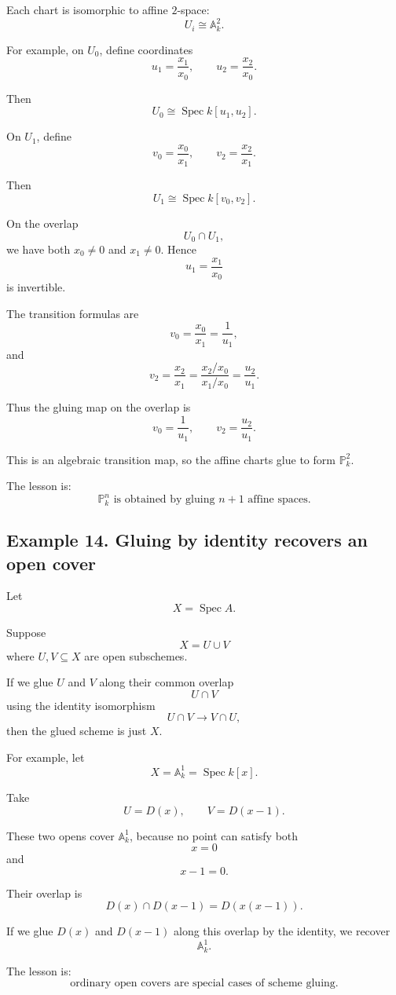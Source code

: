 \documentclass[12pt,a4paper]{article}
\newcommand{\Spec}{\operatorname{Spec}}
\theoremstyle{notespace}
\begin{document}
Each chart is isomorphic to affine \(2\)-space:
\[
U_i\cong\mathbb A^2_k.
\]

For example, on \(U_0\), define coordinates
\[
u_1=\frac{x_1}{x_0},
\qquad
u_2=\frac{x_2}{x_0}.
\]

Then
\[
U_0\cong\Spec k[u_1,u_2].
\]

On \(U_1\), define
\[
v_0=\frac{x_0}{x_1},
\qquad
v_2=\frac{x_2}{x_1}.
\]

Then
\[
U_1\cong\Spec k[v_0,v_2].
\]

On the overlap
\[
U_0\cap U_1,
\]
we have both \(x_0\neq0\) and \(x_1\neq0\). Hence
\[
u_1=\frac{x_1}{x_0}
\]
is invertible.

The transition formulas are
\[
v_0=\frac{x_0}{x_1}=\frac1{u_1},
\]
and
\[
v_2=\frac{x_2}{x_1}
=
\frac{x_2/x_0}{x_1/x_0}
=
\frac{u_2}{u_1}.
\]

Thus the gluing map on the overlap is
\[
v_0=\frac1{u_1},
\qquad
v_2=\frac{u_2}{u_1}.
\]

This is an algebraic transition map, so the affine charts glue to form \(\mathbb P^2_k\).

The lesson is:
\[
\boxed{
	\mathbb P^n_k
	\text{ is obtained by gluing }n+1\text{ affine spaces.}
}
\]

\subsection{Example 14. Gluing by identity recovers an open cover}

Let
\[
X=\Spec A.
\]

Suppose
\[
X=U\cup V
\]
where \(U,V\subseteq X\) are open subschemes.

If we glue \(U\) and \(V\) along their common overlap
\[
U\cap V
\]
using the identity isomorphism
\[
U\cap V\to V\cap U,
\]
then the glued scheme is just \(X\).

For example, let
\[
X=\mathbb A^1_k=\Spec k[x].
\]

Take
\[
U=D(x),
\qquad
V=D(x-1).
\]

These two opens cover \(\mathbb A^1_k\), because no point can satisfy both
\[
x=0
\]
and
\[
x-1=0.
\]

Their overlap is
\[
D(x)\cap D(x-1)=D(x(x-1)).
\]

If we glue \(D(x)\) and \(D(x-1)\) along this overlap by the identity, we recover
\[
\mathbb A^1_k.
\]

The lesson is:
\[
\boxed{
	\text{ordinary open covers are special cases of scheme gluing.}
}
\]
\end{document}
